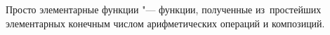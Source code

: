 
    Просто элементарные функции "--- функции, полученные из~простейших элементарных конечным числом арифметических операций и композиций.
